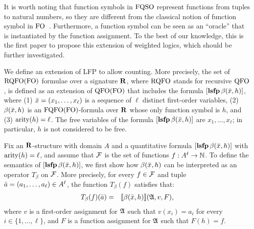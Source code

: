 It is worth noting that function symbols in ${\rm FQSO}$ represent functions from tuples to natural numbers, so they are different from 
the classical notion of function symbol in ${\rm FO}$~\cite{L04}. 
Furthermore, %
a function symbol can be seen as an ``oracle'' that is instantiated by the function assignment. 
To the best of our knowledge, this is the first paper to propose 
this extension of weighted logics, which should be further investigated. 

We define an 
extension of 
LFP \cite{I86,vardi1982complexity} 
to allow counting. 
More precisely, the set of ${\rm RQFO}({\rm FO})$ formulae over a signature $\mathbf{R}$, where ${\rm RQFO}$ stands for recursive ${\rm QFO}$, is defined as an extension of ${\rm QFO}({\rm FO})$ that includes the formula 
$[{\bf lsfp} \, \beta(\bar{x}, h)]$, where (1) $\bar{x} = (x_1, \ldots, x_\ell)$ is a sequence of $\ell$ distinct first-order variables, (2) $\beta(\bar{x}, h)$ is an ${\rm FQFO}({\rm FO})$-formula over $\mathbf{R}$ whose only function symbol is $h$, and (3) ${\rm arity}(h) = \ell$. The free variables of the formula $[{\bf lsfp} \, \beta(\bar{x},h)]$ are $x_1, \ldots, x_\ell$; in particular, $h$ is not considered to be free.

Fix an $\mathbf{R}$-structure with domain $A$ and a quantitative formula $[{\bf lsfp} \, \beta(\bar{x},h)]$ with ${\rm arity}(h) = \ell$, and assume that $\mathcal{F}$ is the set of functions $f :A^\ell \to \mathbb{N}$. To define the semantics of $[{\bf lsfp} \, \beta(\bar{x},h)]$, we first show how $\beta(\bar{x},h)$ can be interpreted as an operator $T_{\beta}$ on $\mathcal{F}$. More precisely, for every $f \in \mathcal{F}$ and tuple $\bar{a} = (a_1, \ldots, a_{\ell}) \in A^\ell$, the function $T_{\beta}(f)$ satisfies that:
\begin{eqnarray*}
T_{\beta}(f)(\bar{a}) & = & {\llbracket{}{\beta(\bar{x}, h)}\rrbracket}(\mathfrak{A},v,F),
\end{eqnarray*}
where $v$ is a first-order assignment  for $\mathfrak{A}$ such that $v(x_i) = a_i$ for every $i \in \{1, \ldots, \ell\}$, and $F$ is a function assignment for $\mathfrak{A}$ such that $F(h) = f$. 

